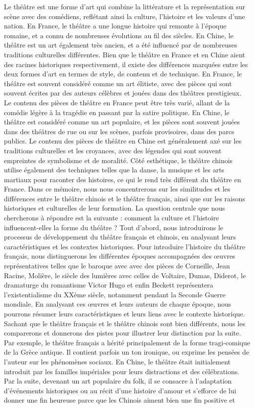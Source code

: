 \documentclass[UTF8,a4paper,12pt]{ctexart}
\numberwithin{equation}{section}
\begin{document}
Le théâtre est une forme d'art qui combine la littérature et la représentation sur scène avec des comédiens, reflétant ainsi la culture, l'histoire et les valeurs d'une nation. En France, le théâtre a une longue histoire qui remonte à l'époque romaine, et a connu de nombreuses évolutions au fil des siècles. En Chine, le théâtre est un art également très ancien, et a été influencé par de nombreuses traditions culturelles différentes. Bien que le théâtre en France et en Chine aient des racines historiques respectivement, il existe des différences marquées entre les deux formes d'art en termes de style, de contenu et de technique. En France, le théâtre est souvent considéré comme un art élitiste, avec des pièces qui sont souvent écrites par des auteurs célèbres et jouées dans des théâtres prestigieux. Le contenu des pièces de théâtre en France peut être très varié, allant de la comédie légère à la tragédie en passant par la satire politique. En Chine, le théâtre est considéré comme un art populaire, et les pièces sont souvent jouées dans des théâtres de rue ou sur les scènes, parfois provisoires, dans des parcs publics. Le contenu des pièces de théâtre en Chine est généralement axé sur les traditions culturelles et les croyances, avec des légendes qui sont souvent empreintes de symbolisme et de moralité. Côté esthétique, le théâtre chinois utilise également des techniques telles que la danse, la musique et les arts martiaux pour raconter des histoires, ce qui le rend très différent du théâtre en France. Dans ce mémoire, nous nous concentrerons sur les similitudes et les différences entre le théâtre chinois et le théâtre français, ainsi que sur les raisons historiques et culturelles de leur formation. La question centrale que nous chercherons à répondre est la suivante : comment la culture et l'histoire influencent-elles la forme du théâtre ? Tout d'abord, nous introduirons le processus de développement du théâtre français et chinois, en analysant leurs caractéristiques et les contextes historiques. Pour introduire l'histoire du théâtre français, nous distinguerons les différentes époques accompagnées des œuvres représentatives telles que le baroque avec avec des pièces de Corneille, Jean Racine, Molière, le siècle des lumières avec celles de Voltaire, Dumas, Diderot, le dramaturge du romantisme Victor Hugo et enfin Beckett représentera l'existentialisme du XXème siècle, notamment pendant la Seconde Guerre mondiale. En analysant ces œuvres et leurs auteurs de chaque époque, nous pourrons résumer leurs caractéristiques et leurs liens avec le contexte historique. Sachant que le théâtre français et le théâtre chinois sont bien différents, nous les comparerons et donnerons des pistes pour illustrer leur distinction par la suite. Par exemple, le théâtre français a hérité principalement de la forme tragi-comique de la Grèce antique. Il contient parfois un ton ironique, ou exprime les pensées de l'auteur sur les phénomènes sociaux. En Chine, le théâtre était initialement introduit par les familles impériales pour leurs distractions et des célébrations. Par la suite, devenant un art populaire du folk, il se consacre à l'adaptation d'événements historiques ou au récit d'une histoire d'amour et s'efforce de lui donner une fin heureuse parce que les Chinois aiment bien une fin positive et 
\end{document}
